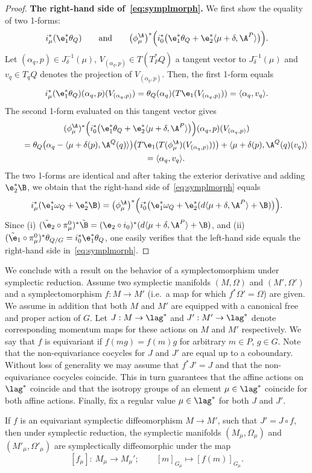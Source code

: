 \begin{proof}
{\bf The right-hand side of~\eqref{eq:symplmorph}.}
We f\/irst show the equality of two 1-forms:
\[
i^*_\mu(\e_1^*\theta_Q)\qquad \mbox{and} \qquad \big(\phi_\mu^\A\big)^*\Big(i^*_0\big(\e_1^*\theta_Q +\e_2^*\langle \mu+\delta,\A^P\rangle\big)\Big).
\] Let $(\alpha_q,p)\in J^{-1}_\delta(\mu)$, $V_{(\alpha_q,p)}\in T( T_P^*Q)$ a tangent vector to $J^{-1}_\delta(\mu)$ and $v_q\in T_qQ$ denotes the projection of $V_{(\alpha_q,p)}$. Then, the f\/irst 1-form equals
\[
i^*_\mu(\e_1^*\theta_Q)(\alpha_q,p)(V_{(\alpha_q,p)})= \theta_Q(\alpha_q)(T\e_1(V_{(\alpha_q,p)}))=\langle \alpha_q, v_q\rangle.
\]
The second 1-form evaluated on this tangent vector gives
\begin{gather*}
   (\phi_\mu^\A)^*\Big(i^*_0\big(\e_1^*\theta_Q +\e_2^*\langle\mu+\delta,\A^P\rangle\big)\Big)(\alpha_q,p)(V_{(\alpha_q,p)}) \\
    \qquad{}  = \theta_Q\big(\alpha_q-\langle\mu+\delta(p),\A^Q(q)\rangle\big)\big(T\e_1(T(\phi^\A_\mu)(V_{(\alpha_q,p)}))\big)  + \langle \mu+\delta(p),\A^Q(q)(v_q)\rangle\\
{} \qquad = \langle \alpha_q, v_q\rangle.
\end{gather*}
The two 1-forms are identical and after taking the exterior derivative and adding $\e^*_2\B$, we obtain that the right-hand side of~\eqref{eq:symplmorph} equals \[i^*_\mu(\e_1^*\omega_Q+\e^*_2\B) = \big(\phi_\mu^{\A}\big)^*\Big(i^*_0\big(\e_1^*\omega_Q +\e_2^*(d\langle \mu+\delta,\A^P\rangle+\B)\big)\Big).\]
Since (i) $(\tilde\e_2\circ\pi^0_\mu)^*\tilde\B = (\e_2\circ i_0)^*(d\langle \mu+\delta,\A^P\rangle+\B)$, and (ii) $(\tilde\e_1\circ\pi^0_\mu)^*\theta_{Q/G}=i_0^*\e_1^*\theta_{Q}$, one easily verif\/ies that the left-hand side equals the right-hand side in~\eqref{eq:symplmorph}.
\end{proof}

We conclude with a result on the behavior of a symplectomorphism under symplectic reduction. Assume two symplectic manifolds $(M,\Omega)$ and $(M',\Omega')$ and a symplectomorphism $f:M\to M'$ (i.e.\ a map for which $f^*\Omega'=\Omega$) are given. We assume in addition that both $M$ and $M'$ are equipped with a canonical free and proper action of $G$. Let $J:M\to \lag^*$ and $J':M'\to \lag^*$ denote corresponding momentum maps for these actions on $M$ and $M'$ respectively. We say that $f$ is equivariant if $f(mg)=f(m)g$ for arbitrary $m\in P$, $g\in G$. Note that the non-equivariance cocycles for $J$ and $J'$ are equal up to a coboundary. Without loss of generality we may assume that $f^*J'=J$ and that the non-equivariance cocycles coincide. This in turn guarantees that the af\/f\/ine actions on $\lag^*$ coincide and that the isotropy groups of an element $\mu\in\lag^*$ coincide for both af\/f\/ine actions. Finally, f\/ix  a regular value $\mu \in \lag^*$ for both $J$ and $J'$.
\begin{theorem}\label{thm:1}
  If $f$ is an equivariant symplectic diffeomorphism $M\to M'$, such that $J'=J \circ f$, then under symplectic reduction, the symplectic manifolds $(M_\mu,\Omega_\mu)$ and $(M'_\mu,\Omega'_\mu)$ are symplectically diffeomorphic under the map
  \[
  [f_\mu]:\ M_\mu\to M_\mu'; \qquad [m]_{G_\mu} \mapsto [f(m)]_{G_\mu}.
  \]
\end{theorem}

